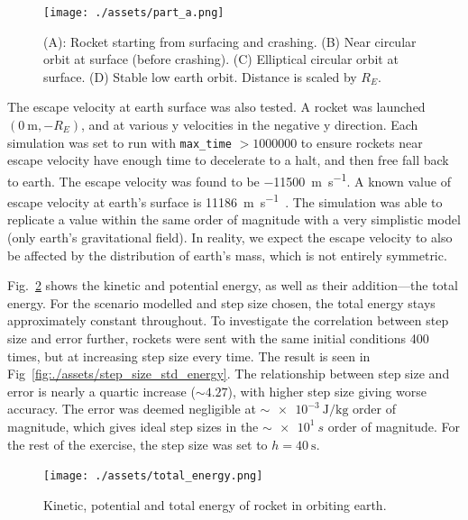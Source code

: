 \documentclass[hyphens,twocolumn,nobalancelastpage,aps,10pt,citeautoscript,longbibliography]{revtex4-2}
\begin{document}
\begin{figure}[htpb]
	\centering
	\texttt{[image: ./assets/part\_a.png]}
	\caption{(A): Rocket starting from surfacing and crashing. (B) Near
	circular orbit at surface (before crashing). (C) Elliptical circular orbit
	at surface. (D) Stable low earth orbit. Distance is scaled by $R_E$.}%
	\label{fig:./assets/part_a}
\end{figure}

The escape velocity at earth surface was also tested. A rocket was launched
$(\qty{0}{\metre}, -R_E)$, and at various y velocities in the negative y
direction. Each simulation was set to run with \lstinline{max_time} $> 1000000$
to ensure rockets near escape velocity have enough time to decelerate to a
halt, and then free fall back to earth. The escape velocity was found to be
\qty{-11500}{\metre\per\second}. A known value of escape velocity at earth's
surface is \qty{11186}{\metre\per\second}~\cite{ev}. The simulation was able to
replicate a value within the same order of magnitude with a very simplistic
model (only earth's gravitational field). In reality, we expect the escape
velocity to also be affected by the distribution of earth's mass, which is not
entirely symmetric.

Fig.~\ref{fig:./assets/total_energy} shows the kinetic and potential energy, as
well as their addition---the total energy. For the scenario modelled and step
size chosen, the total energy stays approximately constant throughout. To
investigate the correlation between step size and error further, rockets were
sent with the same initial conditions 400 times, but at increasing step size
every time. The result is seen in Fig~\ref{fig:./assets/step_size_std_energy}.
The relationship between step size and error is nearly a quartic increase
($\sim 4.27$), with higher step size giving worse accuracy. The error was
deemed negligible at $\sim \qty{e-3}{\joule\per\kilogram}$ order of magnitude,
which gives ideal step sizes in the $\sim\qty{e1}{s}$ order of magnitude. For
the rest of the exercise, the step size was set to $h = \qty{40}{\second}$.

\begin{figure}[htpb]
	\centering
	\texttt{[image: ./assets/total\_energy.png]}
	\caption{Kinetic, potential and total energy of rocket in orbiting earth.}
	\label{fig:./assets/total_energy}
\end{figure}
\end{document}
